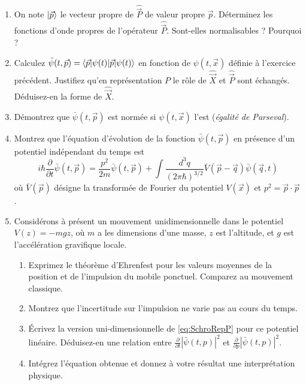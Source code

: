 \begin{enumerate}
\item On note $\ket{\vec p}$ le vecteur propre de $\hat{\vec P}$ de valeur propre $\vec p$. Déterminez les fonctions d'onde propres de l'opérateur $\hat{\vec P}$. Sont-elles normalisables ? Pourquoi ?
\item Calculez $\bar\psi(t,\vec p) = \braket{\vec p|\psi(t)}$ en fonction de $\psi(t,\vec x)$ définie à l'exercice précédent. Justifiez qu'en représentation $P$ le rôle de $\hat{\vec X}$ et $\hat{\vec P}$ sont échangés. Déduisez-en la forme de $\hat{\vec X}$.
\item Démontrez que $\bar\psi(t,\vec p)$ est normée si $\psi(t,\vec x)$ l'est (\textit{égalité de Parseval}).
\item Montrez que l'équation d'évolution de la fonction $\bar\psi(t,\vec p)$ en présence d'un potentiel indépendant du temps est
\begin{equation}
i\hbar \frac{\partial}{\partial t} \bar \psi(t,\vec p) = \frac{p^2}{2m}\bar \psi(t,\vec p) + \int \frac{d^3 q}{(2\pi\hbar)^{3/2}} \bar V(\vec p-\vec q)\bar\psi(\vec q,t) \label{eq:SchroRepP}
\end{equation} 
où $\bar V(\vec p)$ désigne la transformée de Fourier du potentiel $V(\vec x)$ et $p^2=\vec p\cdot\vec p$.
\item Considérons à présent un mouvement unidimensionnelle dans le potentiel $V(z) = -mgz$, où $m$ a les dimensions d'une masse, $z$ est l'altitude, et $g$ est l'accélération gravifique locale.
\begin{enumerate}
\item Exprimez le théorème d'Ehrenfest pour les valeurs moyennes de la position et de l'impulsion du mobile ponctuel. Comparez au mouvement classique.
\item Montrez que l'incertitude sur l'impulsion ne varie pas au cours du temps.
\item Écrivez la version uni-dimensionnelle de \eqref{eq:SchroRepP} pour ce potentiel linéaire. Déduisez-en une relation entre $\frac{\partial}{\partial t}|\bar\psi(t,p)|^2$ et $\frac{\partial}{\partial p}|\bar\psi(t,p)|^2$.
\item Intégrez l'équation obtenue et donnez à votre résultat une interprétation physique.
\end{enumerate} 
\end{enumerate}
$ $

